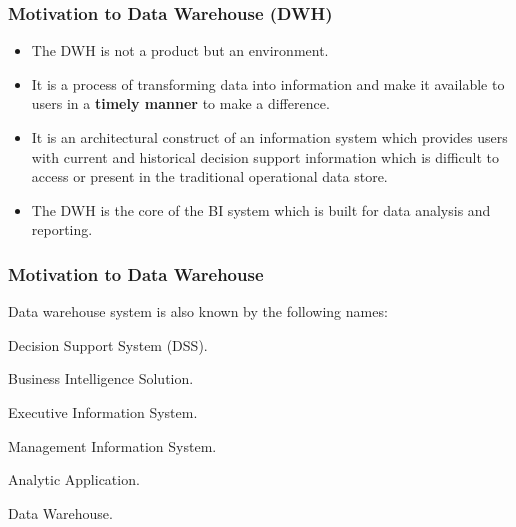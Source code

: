 
\begin{frame}
\frametitle{Motivation to Data Warehouse (DWH)}

\begin{itemize}[<+->]
	\item The DWH is not a product but an environment.
	\item It is a process of transforming data into information and make it available to users in a \textbf{timely manner} to make a difference.
	\item It is an architectural construct of an information system which provides users with current and historical decision support information which is difficult to access or present in the traditional operational data store.
	\item The DWH is the core of the BI system which is built for data analysis and reporting.
\end{itemize}

\end{frame}


\begin{frame}
\frametitle{Motivation to Data Warehouse}

Data warehouse system is also known by the following names:


\begin{wideitemize}
\item Decision Support System (DSS).
\item Business Intelligence Solution.
\item Executive Information System.
\item Management Information System.
\item Analytic Application.
\item Data Warehouse.

\end{wideitemize}


\end{frame}


